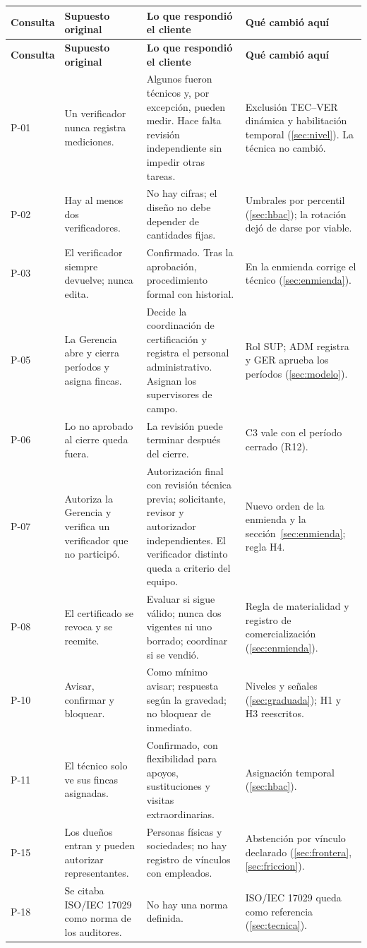 \documentclass[11pt,letterpaper]{article}
\newcommand{\cab}[1]{\textbf{\rmfamily #1}}
\begin{document}
{\small
\renewcommand{\arraystretch}{1.22}
\begin{longtable}{@{}L{1.2cm} L{4.4cm} L{5.6cm} L{4.2cm}@{}}
\toprule
\cab{Consulta} & \cab{Supuesto original} & \cab{Lo que respondió el cliente} & \cab{Qué cambió aquí} \\
\midrule
\endfirsthead
\toprule
\cab{Consulta} & \cab{Supuesto original} & \cab{Lo que respondió el cliente} & \cab{Qué cambió aquí} \\
\midrule
\endhead
\bottomrule
\endfoot
P-01 & Un verificador nunca registra mediciones. & Algunos fueron técnicos y, por excepción, pueden medir. Hace falta revisión independiente sin impedir otras tareas. & Exclusión TEC--VER dinámica y habilitación temporal (\ref{sec:nivel}). La técnica no cambió. \\
P-02 & Hay al menos dos verificadores. & No hay cifras; el diseño no debe depender de cantidades fijas. & Umbrales por percentil (\ref{sec:hbac}); la rotación dejó de darse por viable. \\
P-03 & El verificador siempre devuelve; nunca edita. & Confirmado. Tras la aprobación, procedimiento formal con historial. & En la enmienda corrige el técnico (\ref{sec:enmienda}). \\
P-05 & La Gerencia abre y cierra períodos y asigna fincas. & Decide la coordinación de certificación y registra el personal administrativo. Asignan los supervisores de campo. & Rol SUP; ADM registra y GER aprueba los períodos (\ref{sec:modelo}). \\
P-06 & Lo no aprobado al cierre queda fuera. & La revisión puede terminar después del cierre. & C3 vale con el período cerrado (R12). \\
P-07 & Autoriza la Gerencia y verifica un verificador que no participó. & Autorización final con revisión técnica previa; solicitante, revisor y autorizador independientes. El verificador distinto queda a criterio del equipo. & Nuevo orden de la enmienda y la sección~\ref{sec:enmienda}; regla H4. \\
P-08 & El certificado se revoca y se reemite. & Evaluar si sigue válido; nunca dos vigentes ni uno borrado; coordinar si se vendió. & Regla de materialidad y registro de comercialización (\ref{sec:enmienda}). \\
P-10 & Avisar, confirmar y bloquear. & Como mínimo avisar; respuesta según la gravedad; no bloquear de inmediato. & Niveles y señales (\ref{sec:graduada}); H1 y H3 reescritos. \\
P-11 & El técnico solo ve sus fincas asignadas. & Confirmado, con flexibilidad para apoyos, sustituciones y visitas extraordinarias. & Asignación temporal (\ref{sec:hbac}). \\
P-15 & Los dueños entran y pueden autorizar representantes. & Personas físicas y sociedades; no hay registro de vínculos con empleados. & Abstención por vínculo declarado (\ref{sec:frontera}, \ref{sec:friccion}). \\
P-18 & Se citaba ISO/IEC 17029 como norma de los auditores. & No hay una norma definida. & ISO/IEC 17029 queda como referencia (\ref{sec:tecnica}). \\
\end{longtable}
}
\end{document}
